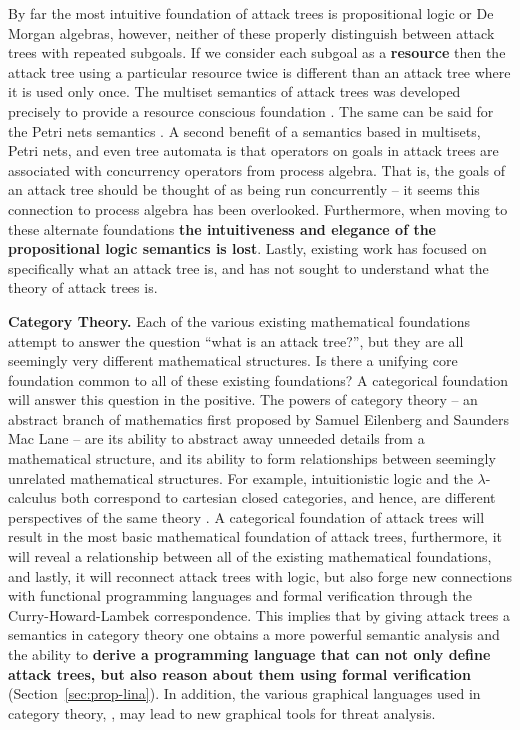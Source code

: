 \begin{full}
By far the most intuitive foundation of attack trees is propositional
logic or De Morgan algebras, however, neither of these properly
distinguish between attack trees with repeated subgoals.  If we
consider each subgoal as a \textbf{resource} then the attack tree
using a particular resource twice is different than an attack tree
where it is used only once.  The multiset semantics of attack trees
was developed precisely to provide a resource conscious foundation
\cite{Mauw:2006}. The same can be said for the Petri nets semantics
\cite{McDermott:2001}.  A second benefit of a semantics based in
multisets, Petri nets, and even tree automata is that operators on
goals in attack trees are associated with concurrency operators from
process algebra.  That is, the goals of an attack tree should be
thought of as being run concurrently -- it seems this connection to
process algebra has been overlooked.  Furthermore, when moving to
these alternate foundations \textbf{the intuitiveness and elegance of
  the propositional logic semantics is lost}.  Lastly, existing work
has focused on specifically what an attack tree is, and has not sought
to understand what the theory of attack trees is.

\textbf{Category Theory.}  Each of the various existing mathematical
foundations attempt to answer the question ``what is an attack
tree?'', but they are all seemingly very different mathematical
structures.  Is there a unifying core foundation common to all of
these existing foundations? A categorical foundation will answer this
question in the positive. The powers of category theory -- an abstract
branch of mathematics first proposed by Samuel Eilenberg and Saunders
Mac Lane \cite{MacLane:1971} -- are its ability to abstract away
unneeded details from a mathematical structure, and its ability to
form relationships between seemingly unrelated mathematical
structures.  For example, intuitionistic logic and the
$\lambda$-calculus both correspond to cartesian closed categories, and
hence, are different perspectives of the same theory
\cite{Lambek:1980}.  A categorical foundation of attack trees will
result in the most basic mathematical foundation of attack trees,
furthermore, it will reveal a relationship between all of the existing
mathematical foundations, and lastly, it will reconnect attack trees
with logic, but also forge new connections with functional programming
languages and formal verification through the Curry-Howard-Lambek
correspondence.  This implies that by giving attack trees a semantics
in category theory one obtains a more powerful semantic analysis and
the ability to \textbf{derive a programming language that can not only
  define attack trees, but also reason about them using formal
  verification} (Section~\ref{sec:prop-lina}).  In addition, the
various graphical languages used in category theory,
\cite{Selinger:2009}, may lead to new graphical tools for threat
analysis.


\end{full}
